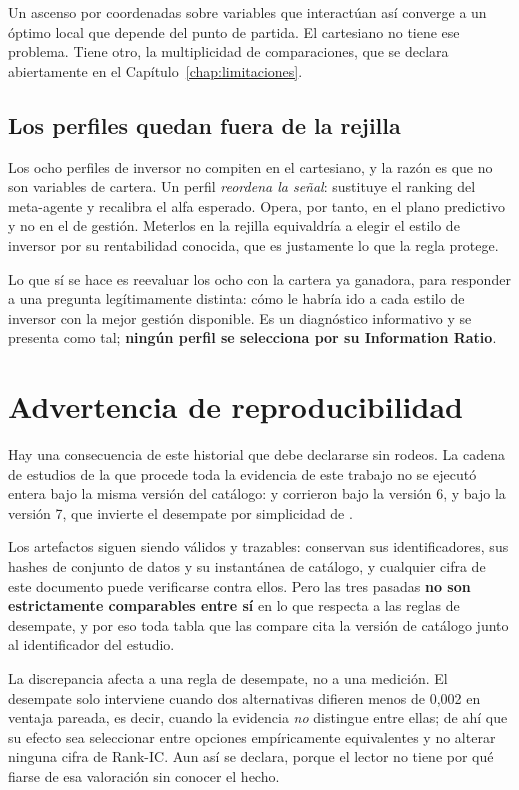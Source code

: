 Un ascenso por coordenadas sobre variables que interactúan así converge a un óptimo local que
depende del punto de partida. El cartesiano no tiene ese problema. Tiene otro, la multiplicidad de
comparaciones, que se declara abiertamente en el Capítulo~\ref{chap:limitaciones}.

\subsection*{Los perfiles quedan fuera de la rejilla}

Los ocho perfiles de inversor no compiten en el cartesiano, y la razón es que no son variables de
cartera. Un perfil \emph{reordena la señal}: sustituye el ranking del meta-agente y recalibra el
alfa esperado. Opera, por tanto, en el plano predictivo y no en el de gestión. Meterlos en la
rejilla equivaldría a elegir el estilo de inversor por su rentabilidad conocida, que es justamente
lo que la regla protege.

Lo que sí se hace es reevaluar los ocho con la cartera ya ganadora, para responder a una pregunta
legítimamente distinta: cómo le habría ido a cada estilo de inversor con la mejor gestión
disponible. Es un diagnóstico informativo y se presenta como tal; \textbf{ningún perfil se
selecciona por su Information Ratio}.

\section{Advertencia de reproducibilidad}
\label{sec:reproducibilidad}

Hay una consecuencia de este historial que debe declararse sin rodeos. La cadena de estudios de la
que procede toda la evidencia de este trabajo no se ejecutó entera bajo la misma versión del
catálogo: \studyidA{} y \studyidB{} corrieron bajo la versión 6, y \studyidC{} bajo la versión 7,
que invierte el desempate por simplicidad de .

Los artefactos siguen siendo válidos y trazables: conservan sus identificadores, sus hashes de
conjunto de datos y su instantánea de catálogo, y cualquier cifra de este documento puede
verificarse contra ellos. Pero las tres pasadas \textbf{no son estrictamente comparables entre sí}
en lo que respecta a las reglas de desempate, y por eso toda tabla que las compare cita la versión
de catálogo junto al identificador del estudio.

La discrepancia afecta a una regla de desempate, no a una medición. El desempate solo interviene
cuando dos alternativas difieren menos de 0,002 en ventaja pareada, es decir, cuando la evidencia
\emph{no} distingue entre ellas; de ahí que su efecto sea seleccionar entre opciones
empíricamente equivalentes y no alterar ninguna cifra de Rank-IC. Aun así se declara, porque el
lector no tiene por qué fiarse de esa valoración sin conocer el hecho.
